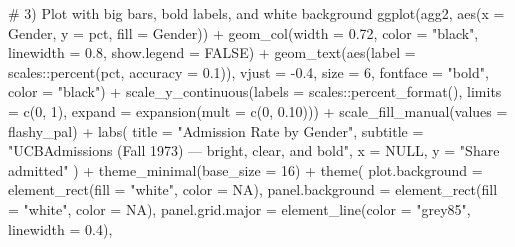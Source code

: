 \documentclass[
  letterpaper,
  DIV=11,
  numbers=noendperiod]{scrreprt}
\newenvironment{Shaded}{\begin{snugshade}}{\end{snugshade}}
\newcommand{\AttributeTok}[1]{\textcolor[rgb]{0.40,0.45,0.13}{#1}}
\newcommand{\CommentTok}[1]{\textcolor[rgb]{0.37,0.37,0.37}{#1}}
\newcommand{\ConstantTok}[1]{\textcolor[rgb]{0.56,0.35,0.01}{#1}}
\newcommand{\DecValTok}[1]{\textcolor[rgb]{0.68,0.00,0.00}{#1}}
\newcommand{\FloatTok}[1]{\textcolor[rgb]{0.68,0.00,0.00}{#1}}
\newcommand{\FunctionTok}[1]{\textcolor[rgb]{0.28,0.35,0.67}{#1}}
\newcommand{\NormalTok}[1]{\textcolor[rgb]{0.00,0.23,0.31}{#1}}
\newcommand{\SpecialCharTok}[1]{\textcolor[rgb]{0.37,0.37,0.37}{#1}}
\newcommand{\StringTok}[1]{\textcolor[rgb]{0.13,0.47,0.30}{#1}}
\begin{document}
\begin{Shaded}
\begin{Highlighting}[]
\CommentTok{\# 3) Plot with big bars, bold labels, and white background}
\FunctionTok{ggplot}\NormalTok{(agg2, }\FunctionTok{aes}\NormalTok{(}\AttributeTok{x =}\NormalTok{ Gender, }\AttributeTok{y =}\NormalTok{ pct, }\AttributeTok{fill =}\NormalTok{ Gender)) }\SpecialCharTok{+}
  \FunctionTok{geom\_col}\NormalTok{(}\AttributeTok{width =} \FloatTok{0.72}\NormalTok{, }\AttributeTok{color =} \StringTok{"black"}\NormalTok{, }\AttributeTok{linewidth =} \FloatTok{0.8}\NormalTok{, }\AttributeTok{show.legend =} \ConstantTok{FALSE}\NormalTok{) }\SpecialCharTok{+}
  \FunctionTok{geom\_text}\NormalTok{(}\FunctionTok{aes}\NormalTok{(}\AttributeTok{label =}\NormalTok{ scales}\SpecialCharTok{::}\FunctionTok{percent}\NormalTok{(pct, }\AttributeTok{accuracy =} \FloatTok{0.1}\NormalTok{)),}
            \AttributeTok{vjust =} \SpecialCharTok{{-}}\FloatTok{0.4}\NormalTok{, }\AttributeTok{size =} \DecValTok{6}\NormalTok{, }\AttributeTok{fontface =} \StringTok{"bold"}\NormalTok{, }\AttributeTok{color =} \StringTok{"black"}\NormalTok{) }\SpecialCharTok{+}
  \FunctionTok{scale\_y\_continuous}\NormalTok{(}\AttributeTok{labels =}\NormalTok{ scales}\SpecialCharTok{::}\FunctionTok{percent\_format}\NormalTok{(),}
                     \AttributeTok{limits =} \FunctionTok{c}\NormalTok{(}\DecValTok{0}\NormalTok{, }\DecValTok{1}\NormalTok{),}
                     \AttributeTok{expand =} \FunctionTok{expansion}\NormalTok{(}\AttributeTok{mult =} \FunctionTok{c}\NormalTok{(}\DecValTok{0}\NormalTok{, }\FloatTok{0.10}\NormalTok{))) }\SpecialCharTok{+}
  \FunctionTok{scale\_fill\_manual}\NormalTok{(}\AttributeTok{values =}\NormalTok{ flashy\_pal) }\SpecialCharTok{+}
  \FunctionTok{labs}\NormalTok{(}
    \AttributeTok{title =} \StringTok{"Admission Rate by Gender"}\NormalTok{,}
    \AttributeTok{subtitle =} \StringTok{"UCBAdmissions (Fall 1973) — bright, clear, and bold"}\NormalTok{,}
    \AttributeTok{x =} \ConstantTok{NULL}\NormalTok{, }\AttributeTok{y =} \StringTok{"Share admitted"}
\NormalTok{  ) }\SpecialCharTok{+}
  \FunctionTok{theme\_minimal}\NormalTok{(}\AttributeTok{base\_size =} \DecValTok{16}\NormalTok{) }\SpecialCharTok{+}
  \FunctionTok{theme}\NormalTok{(}
    \AttributeTok{plot.background  =} \FunctionTok{element\_rect}\NormalTok{(}\AttributeTok{fill =} \StringTok{"white"}\NormalTok{, }\AttributeTok{color =} \ConstantTok{NA}\NormalTok{),}
    \AttributeTok{panel.background =} \FunctionTok{element\_rect}\NormalTok{(}\AttributeTok{fill =} \StringTok{"white"}\NormalTok{, }\AttributeTok{color =} \ConstantTok{NA}\NormalTok{),}
    \AttributeTok{panel.grid.major =} \FunctionTok{element\_line}\NormalTok{(}\AttributeTok{color =} \StringTok{"grey85"}\NormalTok{, }\AttributeTok{linewidth =} \FloatTok{0.4}\NormalTok{),}

\end{Highlighting}
\end{Shaded}
\end{document}

